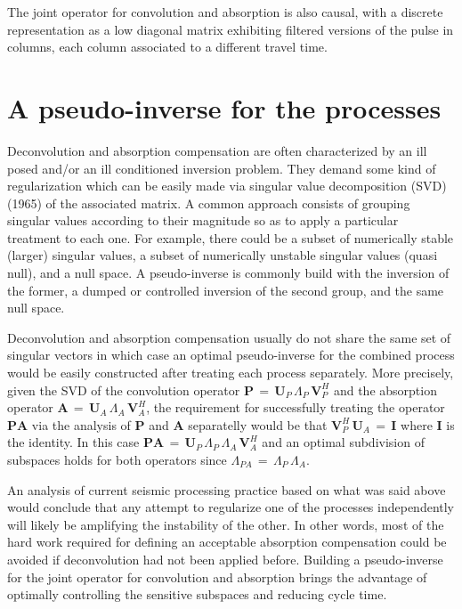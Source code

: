 \documentclass[twoside,letterpaper,twocolumn]{article}
\begin{document}
The joint operator for convolution and absorption is also causal, with a discrete representation 
as a low diagonal matrix exhibiting filtered versions of the pulse in columns, each column associated 
to a different travel time.



\section{A pseudo-inverse for the processes}

Deconvolution and absorption compensation are often characterized by an ill posed and/or an ill
conditioned inversion problem. They demand some kind of regularization which can be easily made via
singular value decomposition (SVD) (1965) of the associated matrix. A common approach 
consists of grouping singular values according to their magnitude so as to apply a particular treatment 
to each one. For example, there could be a subset of numerically stable (larger) singular values, a 
subset of numerically unstable singular values (quasi null), and a null space. A pseudo-inverse is commonly
build with the inversion of the former, a dumped or controlled inversion of the second group, and the 
same null space. 

Deconvolution and absorption compensation usually do not share the same set of singular vectors in which case
an optimal pseudo-inverse for the combined process would be easily constructed after treating each process
separately. More precisely, given the SVD of the convolution operator $\mathbf{P}\,=\,\mathbf{U}_P\,\Lambda_P\,\mathbf{V}^H_P$ and
the absorption operator $\mathbf{A}\,=\,\mathbf{U}_A\,\Lambda_A\,\mathbf{V}^H_A$, the requirement for successfully 
treating the operator $\mathbf{PA}$ via the analysis of $\mathbf{P}$ and $\mathbf{A}$ separatelly would be that 
$\mathbf{V}^H_P\,\mathbf{U}_A\,=\,\mathbf{I}$ where $\mathbf{I}$ is the identity. In this case 
$\mathbf{PA}\,=\,\mathbf{U}_P\,\Lambda_P\,\Lambda_A\,\mathbf{V}^H_A$ and an optimal subdivision of subspaces holds
for both operators since $ \Lambda_{PA}\,=\,\Lambda_P\,\Lambda_A$.

An analysis of current seismic processing practice based on what was said above would conclude that any attempt to
regularize one of the processes independently will likely be amplifying the instability of the other. In other words,
most of the hard work required for defining an acceptable absorption compensation could be avoided if deconvolution 
had not been applied before. Building a pseudo-inverse for the joint operator for convolution and absorption brings 
the advantage of optimally controlling the sensitive subspaces and reducing cycle time.
\end{document}
